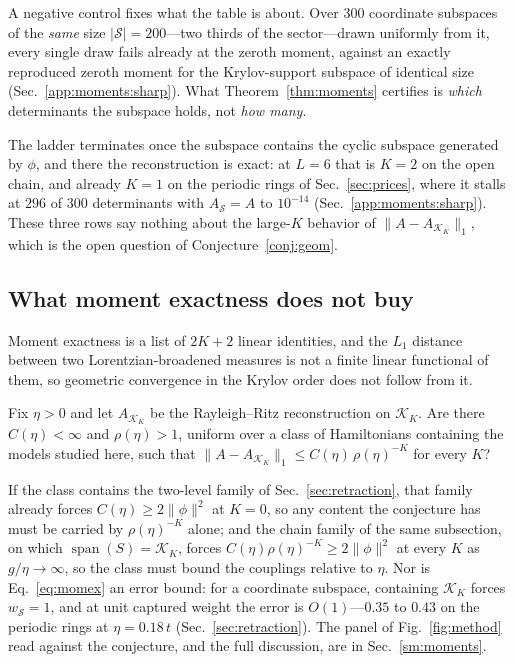 A negative control fixes what the table is about. Over $300$ coordinate subspaces of the \emph{same}
size $|\mathcal S|=200$---two thirds of the sector---drawn uniformly from it, every single draw fails
already at the zeroth moment, against an exactly reproduced zeroth moment for the Krylov-support subspace of
identical size (Sec.~\ref{app:moments:sharp}). What
Theorem~\ref{thm:moments} certifies is \emph{which} determinants the subspace holds, not \emph{how
many}.

The ladder terminates once the subspace contains the cyclic subspace generated by $\phi$, and there the
reconstruction is exact: at $L=6$ that is $K=2$ on the open chain, and already $K=1$ on the periodic
rings of Sec.~\ref{sec:prices}, where it stalls at $296$ of $300$ determinants with $A_{\mathcal S}=A$
to $10^{-14}$ (Sec.~\ref{app:moments:sharp}). These three rows say
nothing about the large-$K$ behavior of $\lVert A-A_{\mathcal K_K}\rVert_1$, which is the open question
of Conjecture~\ref{conj:geom}.

\subsection{What moment exactness does not buy}
\label{sec:moments:notbuy}
Moment exactness is a list of $2K+2$ linear identities, and the $L_1$ distance between two
Lorentzian-broadened measures is not a finite linear functional of them, so geometric convergence in the
Krylov order does not follow from it.

\begin{conjecture}
\label{conj:geom}
Fix $\eta>0$ and let $A_{\mathcal K_K}$ be the Rayleigh--Ritz reconstruction on $\mathcal K_K$. Are
there $C(\eta)<\infty$ and $\rho(\eta)>1$, uniform over a class of Hamiltonians containing the models
studied here, such that $\lVert A-A_{\mathcal K_K}\rVert_{1}\le C(\eta)\,\rho(\eta)^{-K}$ for every
$K$?
\end{conjecture}

\noindent If the class contains the two-level family of Sec.~\ref{sec:retraction}, that family already forces
$C(\eta)\ge2\lVert\phi\rVert^{2}$ at $K=0$, so any content the conjecture has must be carried by
$\rho(\eta)^{-K}$ alone; and the chain family of the same subsection, on which
$\operatorname{span}(S)=\mathcal K_K$, forces $C(\eta)\rho(\eta)^{-K}\ge2\lVert\phi\rVert^{2}$ at every
$K$ as $g/\eta\to\infty$, so the class must bound the couplings relative to $\eta$. Nor is
Eq.~\eqref{eq:momex} an error bound: for a coordinate subspace, containing $\mathcal K_K$ forces
$w_{\mathcal S}=1$, and at unit captured weight the error is $O(1)$---$0.35$ to $0.43$ on the periodic
rings at $\eta=0.18\,t$ (Sec.~\ref{sec:retraction}). The panel of Fig.~\ref{fig:method} read against the conjecture, and the full
discussion, are in Sec.~\ref{sm:moments}.

